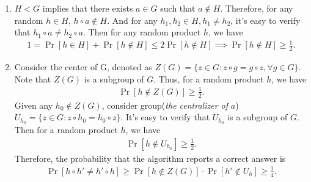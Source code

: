 \begin{answer}
	\begin{enumerate}[label=\alph*).]
		\item $H < G$ implies that there exists $a \in G$ such that $a \notin H$. Therefore, for any random $h \in H$, $h \circ a \notin H$. And for any $h_1, h_2 \in H, h_1\neq h_2$, it's easy to verify that $h_1\circ a \neq h_2\circ a$. 
		Then for any random product $h$, we have 
		\begin{align*}
			1 = \Pr[h\in H] + \Pr[h\notin H] \le 2\Pr[h\notin H] \implies \Pr[h\notin H] \ge \frac{1}{2}.
		\end{align*}
		\item Consider the center of G, denoted as $Z(G) = \{z\in G: z\circ g = g\circ z, \forall g\in G\}$. Note that $Z(G)$ is a subgroup of $G$. 
		Thus, for a random product $h$, we have
		\begin{align*}
			\Pr[h\notin Z(G)] \ge \frac{1}{2}.
		\end{align*}
		Given any $h_0\notin Z(G)$, consider group(\textit{the centralizer of} $a$) $U_{h_0} = \{z \in G: z\circ h_0 = h_0\circ z\}$. It's easy to verify that $U_{h_0}$ is a subgroup of $G$. 
		Then for a random product $h$, we have
		\begin{align*}
			\Pr[h\notin U_{h_0}] \ge \frac{1}{2}.
		\end{align*}
		Therefore, the probability that the algorithm reports a correct answer is
		\begin{align*}
			\Pr[h\circ h'\neq h'\circ h] \ge \Pr[h\notin Z(G)]\cdot \Pr[h'\notin U_{h}] \ge \frac{1}{4}.
		\end{align*}
	\end{enumerate}
	\ed
\end{answer}